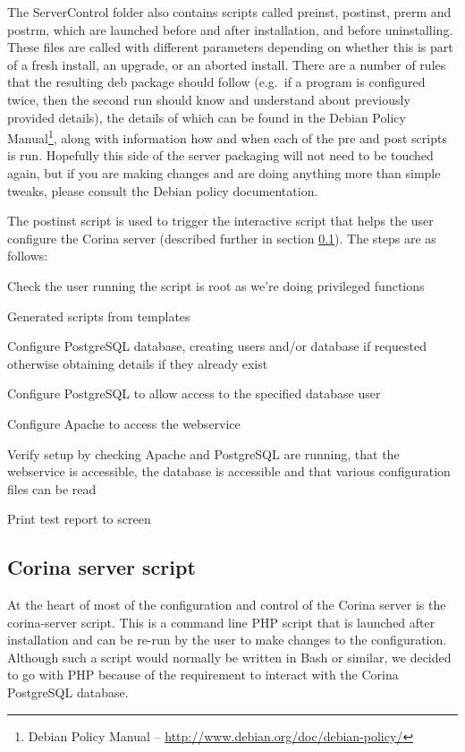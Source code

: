 The ServerControl folder also contains scripts called preinst, postinst, prerm and postrm, which are launched before and after installation, and before uninstalling.  These files are called with different parameters depending on whether this is part of a fresh install, an upgrade, or an aborted install.  There are a number of rules that the resulting deb package should follow (e.g.\ if a program is configured twice, then the second run should know and understand about previously provided details), the details of which can be found in the Debian Policy Manual\footnote{Debian Policy Manual -- \url{http://www.debian.org/doc/debian-policy/}}, along with information how and when each of the pre and post scripts is run.  Hopefully this side of the server packaging will not need to be touched again, but if you are making changes and are doing anything more than simple tweaks, please consult the Debian policy documentation.

The postinst script is used to trigger the interactive script that helps the user configure the Corina server (described further in section \ref{txt:corina-server-script}).  The steps are as follows:  

\begin{itemize*}
 \item Check the user running the script is root as we're doing privileged functions
 \item Generated scripts from templates
 \item Configure PostgreSQL database, creating users and/or database if requested otherwise obtaining details if they already exist
 \item Configure PostgreSQL to allow access to the specified database user
 \item Configure Apache to access the webservice
 \item Verify setup by checking Apache and PostgreSQL are running, that the webservice is accessible, the database is accessible and that various configuration files can be read
 \item Print test report to screen
\end{itemize*}

\subsection{Corina server script}
\label{txt:corina-server-script}

At the heart of most of the configuration and control of the Corina server is the corina-server script.  This is a command line PHP script that is launched after installation and can be re-run by the user to make changes to the configuration.  Although such a script would normally be written in Bash or similar, we decided to go with PHP because of the requirement to interact with the Corina PostgreSQL database.  

